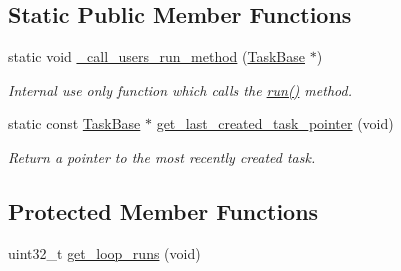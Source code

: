 \subsection*{Static Public Member Functions}
\begin{DoxyCompactItemize}
\item 
static void \mbox{\hyperlink{class_task_base_a9884c542600faa2f90da35c832fea87a}{\+\_\+call\+\_\+users\+\_\+run\+\_\+method}} (\mbox{\hyperlink{class_task_base}{Task\+Base}} $\ast$)
\begin{DoxyCompactList}\small\item\em Internal use only function which calls the {\ttfamily \mbox{\hyperlink{class_task_base_adcf6036ad9c860051ccf392ba5e7dbbc}{run()}}} method. \end{DoxyCompactList}\item 
static const \mbox{\hyperlink{class_task_base}{Task\+Base}} $\ast$ \mbox{\hyperlink{class_task_base_a6d6efe1287e0d4b73064af05626e48d2}{get\+\_\+last\+\_\+created\+\_\+task\+\_\+pointer}} (void)
\begin{DoxyCompactList}\small\item\em Return a pointer to the most recently created task. \end{DoxyCompactList}\end{DoxyCompactItemize}
\subsection*{Protected Member Functions}
\begin{DoxyCompactItemize}
\item 
uint32\+\_\+t \mbox{\hyperlink{class_task_base_adbc9cc6b14c5396c38457edc9c9bc215}{get\+\_\+loop\+\_\+runs}} (void)
\end{DoxyCompactItemize}
